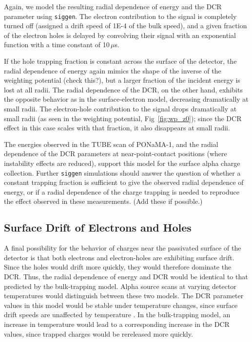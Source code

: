Again, we model the resulting radial dependence of energy and the DCR parameter using {\tt siggen}. The electron contribution to the signal is completely turned off (assigned a drift speed of 1E-4 of the bulk speed), and a given fraction of the electron holes is delayed by convolving their signal with an exponential function with a time constant of 10\,$\mu$s. 

If the hole trapping fraction is constant across the surface of the detector, the radial dependence of energy again mimics the shape of the inverse of the weighting potential (check this?), but a larger fraction of the incident energy is lost at all radii. The radial dependence of the DCR, on the other hand, exhibits the opposite behavior as in the surface-electron model, decreasing dramatically at small radii. The electron-hole contribution to the signal drops dramatically at small radii (as seen in the weighting potential, Fig~\ref{fig:wp_z0}); since the DCR effect in this case scales with that fraction, it also disappears at small radii. 

The energies observed in the TUBE scan of PONaMA-1, and the radial dependence of the DCR parameters at near-point-contact positions (where instability effects are reduced), support this model for the surface alpha charge collection. Further {\tt siggen} simulations should answer the question of whether a constant trapping fraction is sufficient to give the observed radial dependence of energy, or if a radial dependence of the charge trapping is needed to reproduce the effect observed in these measurements. (Add these if possible.)

\subsection{Surface Drift of Electrons and Holes}
A final possibility for the behavior of charges near the passivated surface of the detector is that both electrons and electron-holes are exhibiting surface drift. Since the holes would drift more quickly, they would therefore dominate the DCR. Thus, the radial dependence of energy and DCR would be identical to that predicted by the bulk-trapping model. Alpha source scans at varying detector temperatures would distinguish between these two models. The DCR parameter values in this model would be stable under temperature changes, since surface drift speeds are unaffected by temperature \cite{Mullowney2012?}. In the bulk-trapping model, an increase in temperature would lead to a corresponding increase in the DCR values, since trapped charges would be rereleased more quickly. 

